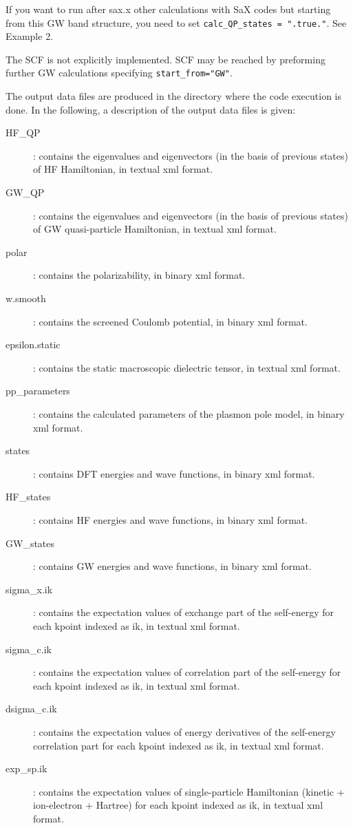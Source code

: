 \documentclass[11pt]{article}
\begin{document}
\begin{description}
    If you want to run after sax.x other calculations with SaX codes but starting from this GW band structure, you need to set \texttt{calc\_QP\_states = ".true."}. See Example 2.

The SCF is not explicitly implemented. SCF may be reached by preforming further GW calculations specifying \texttt{start\_from="GW"}. 
\end{description}

The output data files are produced in the directory where the code execution is done. In the following, a description of the output data files is given:

\begin{description}
\item[HF\_QP]: contains the eigenvalues and eigenvectors (in the basis of previous states) of HF Hamiltonian, in textual xml format.
\item[GW\_QP]: contains the eigenvalues and eigenvectors (in the basis of previous states) of GW quasi-particle Hamiltonian, in textual xml format.
\item[polar]: contains the polarizability, in binary xml format.
\item[w.smooth]: contains the screened Coulomb potential, in binary xml format.
\item[epsilon.static]: contains the static macroscopic dielectric tensor, in textual xml format.
\item[pp\_parameters]: contains the calculated parameters of the plasmon pole model, in binary xml format.
\item[states]: contains DFT energies and wave functions, in binary xml format.
\item[HF\_states]: contains HF energies and wave functions, in binary xml format.
\item[GW\_states]: contains GW energies and wave functions, in binary xml format.
\item[sigma\_x.ik]: contains the expectation values of exchange part of the self-energy for each kpoint indexed as ik, in textual xml format.
\item[sigma\_c.ik]: contains the expectation values of correlation part of the self-energy for each kpoint indexed as ik, in textual xml format.
\item[dsigma\_c.ik]: contains the expectation values of energy derivatives of the self-energy correlation part for each kpoint indexed as ik, in textual xml format.
\item[exp\_sp.ik]: contains the expectation values of single-particle Hamiltonian (kinetic + ion-electron + Hartree) for each kpoint indexed as ik, in textual xml format. 
\end{description}
\end{document}
